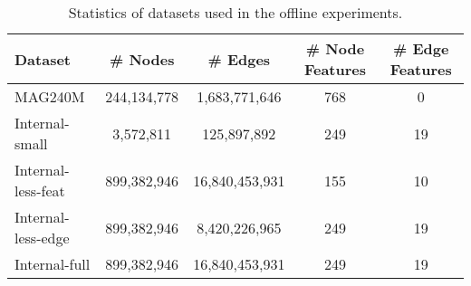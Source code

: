 \begin{table}[h]
\centering
\caption{Statistics of datasets used in the offline experiments.}
\label{tab:datasets}
\begin{tabular}{l|cccc} 
\toprule
Dataset & \# Nodes & \# Edges & \# Node Features & \# Edge Features \\ 
\midrule
MAG240M & 244,134,778 & 1,683,771,646 & 768 & 0 \\
Internal-small & 3,572,811 & 125,897,892 & 249 & 19\\
Internal-less-feat & 899,382,946 & 16,840,453,931 & 155 & 10 \\
Internal-less-edge & 899,382,946 & 8,420,226,965 & 249 & 19 \\
Internal-full & 899,382,946 & 16,840,453,931 & 249 & 19\\
\bottomrule
\end{tabular}
\end{table}
